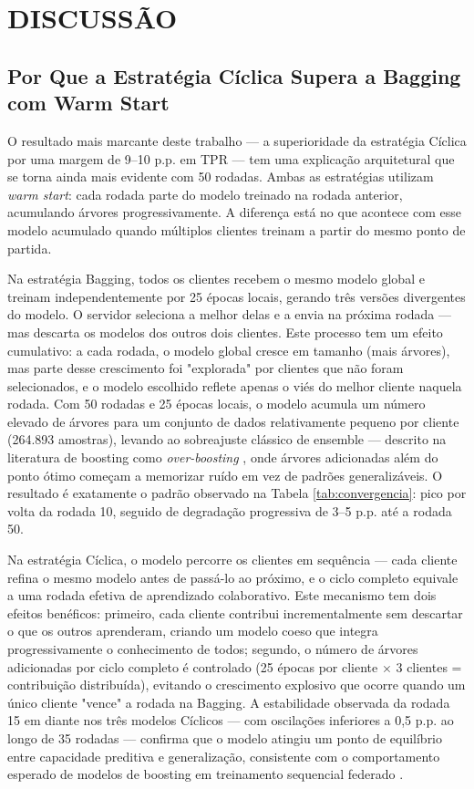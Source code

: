 \section{DISCUSSÃO}

\subsection{Por Que a Estratégia Cíclica Supera a Bagging com Warm Start}

O resultado mais marcante deste trabalho --- a superioridade da estratégia Cíclica por uma margem de 9--10 p.p. em TPR --- tem uma explicação arquitetural que se torna ainda mais evidente com 50 rodadas. Ambas as estratégias utilizam \textit{warm start}: cada rodada parte do modelo treinado na rodada anterior, acumulando árvores progressivamente. A diferença está no que acontece com esse modelo acumulado quando múltiplos clientes treinam a partir do mesmo ponto de partida.

Na estratégia Bagging, todos os clientes recebem o mesmo modelo global e treinam independentemente por 25 épocas locais, gerando três versões divergentes do modelo. O servidor seleciona a melhor delas e a envia na próxima rodada --- mas descarta os modelos dos outros dois clientes. Este processo tem um efeito cumulativo: a cada rodada, o modelo global cresce em tamanho (mais árvores), mas parte desse crescimento foi "explorada" por clientes que não foram selecionados, e o modelo escolhido reflete apenas o viés do melhor cliente naquela rodada. Com 50 rodadas e 25 épocas locais, o modelo acumula um número elevado de árvores para um conjunto de dados relativamente pequeno por cliente (264.893 amostras), levando ao sobreajuste clássico de ensemble --- descrito na literatura de boosting como \textit{over-boosting} \cite{chen2016xgboost, ke2017lightgbm}, onde árvores adicionadas além do ponto ótimo começam a memorizar ruído em vez de padrões generalizáveis. O resultado é exatamente o padrão observado na Tabela \ref{tab:convergencia}: pico por volta da rodada 10, seguido de degradação progressiva de 3--5 p.p. até a rodada 50.

Na estratégia Cíclica, o modelo percorre os clientes em sequência --- cada cliente refina o mesmo modelo antes de passá-lo ao próximo, e o ciclo completo equivale a uma rodada efetiva de aprendizado colaborativo. Este mecanismo tem dois efeitos benéficos: primeiro, cada cliente contribui incrementalmente sem descartar o que os outros aprenderam, criando um modelo coeso que integra progressivamente o conhecimento de todos; segundo, o número de árvores adicionadas por ciclo completo é controlado (25 épocas por cliente $\times$ 3 clientes = contribuição distribuída), evitando o crescimento explosivo que ocorre quando um único cliente "vence" a rodada na Bagging. A estabilidade observada da rodada 15 em diante nos três modelos Cíclicos --- com oscilações inferiores a 0,5 p.p. ao longo de 35 rodadas --- confirma que o modelo atingiu um ponto de equilíbrio entre capacidade preditiva e generalização, consistente com o comportamento esperado de modelos de boosting em treinamento sequencial federado \cite{li2020practical}.

